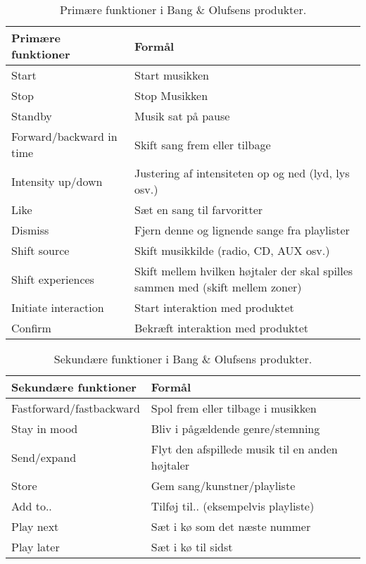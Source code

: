 %
\begin{table}[H]
	\centering
	\begin{tabular}{ | l | p{8cm} |}
		\hline
		\multicolumn{1}{|l|}{\textbf{Primære funktioner}} & \multicolumn{1}{l|}{\textbf{Formål}} \\ \hline
		Start & Start musikken \\ \hline
		Stop & Stop Musikken \\ \hline
		Standby & Musik sat på pause \\ \hline
		Forward/backward in time & Skift sang frem eller tilbage \\ \hline
		Intensity up/down & Justering af intensiteten op og ned (lyd, lys osv.) \\ \hline
		Like & Sæt en sang til farvoritter \\ \hline
		Dismiss & Fjern denne og lignende sange fra playlister \\ \hline
		Shift source & Skift musikkilde (radio, CD, AUX osv.) \\ \hline
		Shift experiences & Skift mellem hvilken højtaler der skal spilles sammen med (skift mellem zoner) \\ \hline
		Initiate interaction & Start interaktion med produktet \\ \hline
		Confirm & Bekræft interaktion med produktet \\ \hline
	\end{tabular}
	\caption{Primære funktioner i Bang $\&$ Olufsens produkter.}
	\label{tab:BogOsPrimaereFunktioner}
\end{table}
\noindent
%

%
\begin{table}[H]
	\centering
	\begin{tabular}{ | l | p{8cm} |}
		\hline
		\multicolumn{1}{|l|}{\textbf{Sekundære funktioner}} & \multicolumn{1}{l|}{\textbf{Formål}} \\ \hline
		Fastforward/fastbackward & Spol frem eller tilbage i musikken \\ \hline
		Stay in mood & Bliv i pågældende genre/stemning \\ \hline
		Send/expand & Flyt den afspillede musik til en anden højtaler \\ \hline
		Store & Gem sang/kunstner/playliste \\ \hline
		Add to.. & Tilføj til.. (eksempelvis playliste) \\ \hline
		Play next & Sæt i kø som det næste nummer \\ \hline
		Play later & Sæt i kø til sidst \\ \hline
	\end{tabular}
	\caption{Sekundære funktioner i Bang $\&$ Olufsens produkter.}
	\label{tab:BogOsSekundaereFunktioner}
\end{table}
\noindent
%

